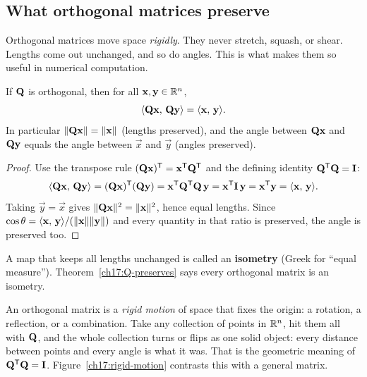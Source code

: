 \subsection{What orthogonal matrices preserve}

Orthogonal matrices move space \emph{rigidly}. They never stretch, squash, or shear. Lengths come
out unchanged, and so do angles. This is what makes them so useful in numerical computation.

\begin{theorem}\label{ch17:Q-preserves}
If $\mathbf{Q}$ is orthogonal, then for all $\mathbf{x},\mathbf{y}\in\mathbb{R}^n$,
\[
  \langle \mathbf{Q}\mathbf{x},\, \mathbf{Q}\mathbf{y} \rangle = \langle \mathbf{x},\, \mathbf{y} \rangle.
\]
In particular $\lVert\mathbf{Q}\mathbf{x}\rVert=\lVert\mathbf{x}\rVert$ (lengths preserved), and the angle between
$\mathbf{Q}\mathbf{x}$ and $\mathbf{Q}\mathbf{y}$ equals the angle between $\vec x$ and $\vec y$ (angles preserved).
\end{theorem}

\begin{proof}
Use the transpose rule $(\mathbf{Q}\mathbf{x})^{\mathsf{T}}=\mathbf{x}^{\mathsf{T}}\mathbf{Q}^{\mathsf{T}}$ and the defining identity
$\mathbf{Q}^{\mathsf{T}}\mathbf{Q}=\mathbf{I}$:
\[
  \langle \mathbf{Q}\mathbf{x},\, \mathbf{Q}\mathbf{y} \rangle
  = (\mathbf{Q}\mathbf{x})^{\mathsf{T}}(\mathbf{Q}\mathbf{y})
  = \mathbf{x}^{\mathsf{T}} \mathbf{Q}^{\mathsf{T}}\mathbf{Q}\,\mathbf{y}
  = \mathbf{x}^{\mathsf{T}}\mathbf{I}\,\mathbf{y}
  = \mathbf{x}^{\mathsf{T}}\mathbf{y}
  = \langle \mathbf{x},\, \mathbf{y} \rangle.
\]
Taking $\vec y=\vec x$ gives $\lVert\mathbf{Q}\mathbf{x}\rVert^2=\lVert\mathbf{x}\rVert^2$, hence equal lengths. Since
$\cos\theta=\langle \mathbf{x},\, \mathbf{y} \rangle/(\lVert\mathbf{x}\rVert\lVert\mathbf{y}\rVert)$ and every quantity in that ratio is
preserved, the angle is preserved too.
\end{proof}

A map that keeps all lengths unchanged is called an \textbf{isometry} (Greek for ``equal
measure''). Theorem~\ref{ch17:Q-preserves} says every orthogonal matrix is an isometry.

\begin{intuitionbox}
An orthogonal matrix is a \emph{rigid motion} of space that fixes the origin: a rotation, a
reflection, or a combination. Take any collection of points in $\mathbb{R}^n$, hit them all with
$\mathbf{Q}$, and the whole collection turns or flips as one solid object: every distance between
points and every angle is what it was. That is the geometric meaning
of $\mathbf{Q}^{\mathsf{T}}\mathbf{Q}=\mathbf{I}$. Figure~\ref{ch17:rigid-motion} contrasts this with a general matrix.
\end{intuitionbox}

